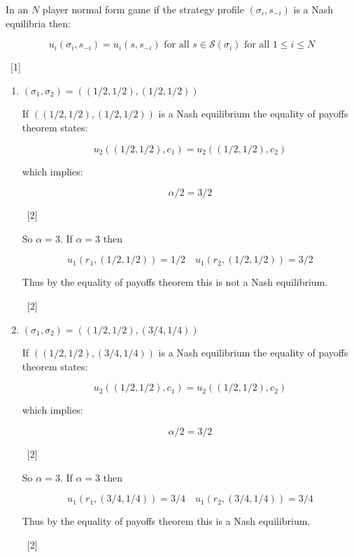\documentclass[12pt,a4paper]{article}
\begin{document}
\begin{enumerate}
\begin{enumerate}
\begin{enumerate}
            In an $N$ player normal form game if the strategy profile $(\sigma_i,s_{-i})$ is a Nash equilibria then:

            $$u_{i}(\sigma_i,s_{-i})=u_{i}(s,s_{-i})\text{ for all }s\in\mathcal{S}(\sigma_i)\text{ for all }1\leq i\leq N$$

            ~\hfill{[1]}

                \begin{enumerate}
                    \item \((\sigma_1, \sigma_2) = ((1/2,1/2), (1/2,1/2))\)

                    If \(((1/2,1/2), (1/2,1/2))\) is a Nash equilibrium the
                    equality of payoffs theorem states:

                    \[u_2((1/2,1/2),c_1)=u_2((1/2,1/2),c_2)\]

                    which implies:

                    \[\alpha/2=3/2\]

                    ~\hfill{[2]}

                    So \(\alpha=3\). If \(\alpha=3\) then

                    \[u_1(r_1, (1/2,1/2))=1/2\quad u_1(r_2, (1/2,1/2))=3/2\]

                    Thus by the equality of payoffs theorem this is not a Nash
                    equilibrium.

                    ~\hfill{[2]}

                    \item \((\sigma_1, \sigma_2) = ((1/2,1/2), (3/4,1/4))\)

                    If \(((1/2,1/2), (3/4,1/4))\) is a Nash equilibrium the
                    equality of payoffs theorem states:

                    \[u_2((1/2,1/2),c_1)=u_2((1/2,1/2),c_2)\]

                    which implies:

                    \[\alpha/2=3/2\]

                    ~\hfill{[2]}

                    So \(\alpha=3\). If \(\alpha=3\) then

                    \[u_1(r_1, (3/4,1/4))=3/4\quad u_1(r_2, (3/4,1/4))=3/4\]

                    Thus by the equality of payoffs theorem this is a Nash
                    equilibrium.

                    ~\hfill{[2]}


\end{enumerate}
\end{enumerate}
\end{enumerate}
\end{enumerate}
\end{document}
